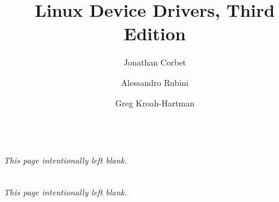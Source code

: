 \documentclass{book}
\title{Linux Device Drivers, Third Edition}
\author{Jonathan Corbet \and Alessandro Rubini \and Greg Kroah-Hartman}
\begin{document}





\newpage
{}
\setcounter{page}{1}



















\newpage
\begin{center}
    \ \\
    \vspace{0.33\textheight}
    {\itshape{}This page intentionally left blank.}
\end{center}
\newpage



\newpage
\begin{center}
    \ \\
    \vspace{0.33\textheight}
    {\itshape{}This page intentionally left blank.}
\end{center}
\newpage


\end{document}
